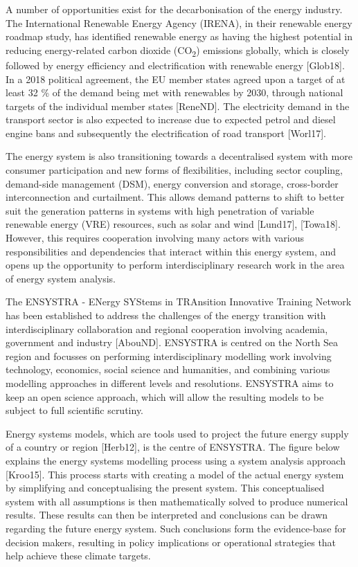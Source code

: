 A number of opportunities exist for the decarbonisation of the energy
industry. The International Renewable Energy Agency (IRENA), in their
renewable energy roadmap study, has identified renewable energy as
having the highest potential in reducing energy-related carbon dioxide
(CO\textsubscript{2}) emissions globally, which is closely followed by
energy efficiency and electrification with renewable energy
{[}Glob18{]}. In a 2018 political agreement, the EU member states agreed
upon a target of at least 32 \% of the demand being met with renewables
by 2030, through national targets of the individual member states
{[}ReneND{]}. The electricity demand in the transport sector is also
expected to increase due to expected petrol and diesel engine bans and
subsequently the electrification of road transport {[}Worl17{]}.

The energy system is also transitioning towards a decentralised system
with more consumer participation and new forms of flexibilities,
including sector coupling, demand-side management (DSM), energy
conversion and storage, cross-border interconnection and curtailment.
This allows demand patterns to shift to better suit the generation
patterns in systems with high penetration of variable renewable energy
(VRE) resources, such as solar and wind {[}Lund17{]}, {[}Towa18{]}.
However, this requires cooperation involving many actors with various
responsibilities and dependencies that interact within this energy
system, and opens up the opportunity to perform interdisciplinary
research work in the area of energy system analysis.

The ENSYSTRA - ENergy SYStems in TRAnsition Innovative Training Network
has been established to address the challenges of the energy transition
with interdisciplinary collaboration and regional cooperation involving
academia, government and industry {[}AbouND{]}. ENSYSTRA is centred on
the North Sea region and focusses on performing interdisciplinary
modelling work involving technology, economics, social science and
humanities, and combining various modelling approaches in different
levels and resolutions. ENSYSTRA aims to keep an open science approach,
which will allow the resulting models to be subject to full scientific
scrutiny.

Energy systems models, which are tools used to project the future energy
supply of a country or region {[}Herb12{]}, is the centre of ENSYSTRA.
The figure below explains the energy systems modelling process using a
system analysis approach {[}Kroo15{]}. This process starts with creating
a model of the actual energy system by simplifying and conceptualising
the present system. This conceptualised system with all assumptions is
then mathematically solved to produce numerical results. These results
can then be interpreted and conclusions can be drawn regarding the
future energy system. Such conclusions form the evidence-base for
decision makers, resulting in policy implications or operational
strategies that help achieve these climate targets.

